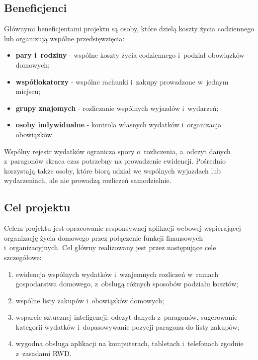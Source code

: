 \subsection{Beneficjenci}

Głównymi beneficjentami projektu są osoby, które dzielą koszty życia codziennego lub organizują wspólne przedsięwzięcia:

\begin{itemize}
  \item \textbf{pary i~rodziny} - wspólne koszty życia codziennego i~podział obowiązków domowych;
  \item \textbf{współlokatorzy} - wspólne rachunki i~zakupy prowadzone w~jednym miejscu;
  \item \textbf{grupy znajomych} - rozliczanie wspólnych wyjazdów i~wydarzeń;
  \item \textbf{osoby indywidualne} - kontrola własnych wydatków i~organizacja obowiązków.
\end{itemize}

Wspólny rejestr wydatków ogranicza spory o~rozliczenia, a~odczyt danych z~paragonów skraca czas potrzebny na prowadzenie ewidencji. Pośrednio korzystają także osoby, które biorą udział we wspólnych wyjazdach lub wydarzeniach, ale nie prowadzą rozliczeń samodzielnie.

\subsection{Cel projektu}

Celem projektu jest opracowanie responsywnej aplikacji webowej wspierającej organizację życia domowego przez połączenie funkcji finansowych i~organizacyjnych. Cel główny realizowany jest przez następujące cele szczegółowe:

\begin{enumerate}
  \item ewidencja wspólnych wydatków i~wzajemnych rozliczeń w~ramach gospodarstwa domowego, z~obsługą różnych sposobów podziału kosztów;
  \item wspólne listy zakupów i~obowiązków domowych;
  \item wsparcie sztucznej inteligencji: odczyt danych z~paragonów, sugerowanie kategorii wydatków i~dopasowywanie pozycji paragonu do listy zakupów;
  \item wygodna obsługa aplikacji na komputerach, tabletach i~telefonach zgodnie z~zasadami RWD.
\end{enumerate}

